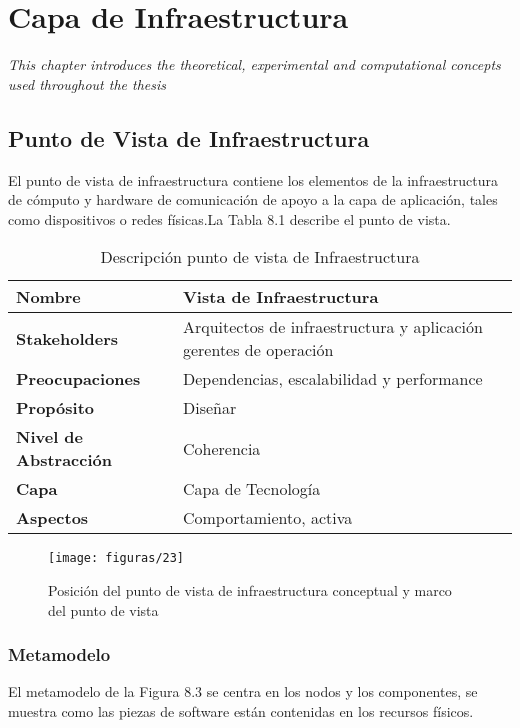 \chapter{Capa de Infraestructura}
\label{chap:Infraestructura}
\textit{This chapter introduces the theoretical, experimental and computational concepts used throughout the thesis}
\vspace{2ex}\vfill
\minitoc
\newpage

\section{Punto de Vista de Infraestructura}
El punto de vista de infraestructura contiene los elementos de la infraestructura de cómputo y hardware de comunicación de apoyo a la capa de aplicación, tales como dispositivos o redes físicas.La Tabla 8.1 describe el punto de vista.

  \begin{table}[H]
  	\centering
  	\begin{tabular}{p{3.7cm}p{8cm}}
  		\hline
  		\rowcolor[HTML]{0073a1}
  		{\color[HTML]{FFFFFF} \textbf{Nombre}} & {\color[HTML]{FFFFFF} \textbf{Vista de Infraestructura}} \\
  		\hline
  		\textbf{Stakeholders} & Arquitectos de infraestructura y aplicación gerentes de operación \\
  		\textbf{Preocupaciones} & Dependencias, escalabilidad y performance  \\
  		\textbf{Propósito} & Diseñar \\
  		\textbf{Nivel de Abstracción} & Coherencia \\
  		\textbf{Capa} & Capa de Tecnología \\
  		\textbf{Aspectos} & Comportamiento, activa \\
  		\bottomrule
  	\end{tabular}
  	\captionsetup{width=.95\textwidth}
  	\caption{Descripción punto de vista de Infraestructura}
  	\label{tabla14}
  \end{table}

  \begin{figure}[H]
	\centering
	\texttt{[image: figuras/23]}
	\captionsetup{width=.95\textwidth}
	\caption{Posición del punto de vista de infraestructura conceptual y marco del punto de vista}
	\label{figura23a}
  \end{figure}

  \subsection{Metamodelo}
  El metamodelo de la Figura 8.3 se centra en los nodos y los componentes, se muestra como las piezas de software están contenidas en los recursos físicos.

